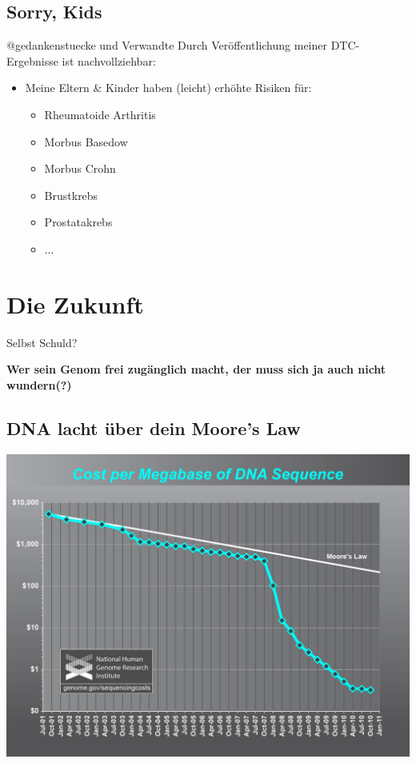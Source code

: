 \documentclass[12pt,a4paper]{beamer}
\begin{document}
\subsection{Sorry, Kids}
\begin{frame}{@gedankenstuecke und Verwandte}
	Durch Veröffentlichung meiner DTC-Ergebnisse ist nachvollziehbar: 
	\begin{itemize}
		\pause \item Meine Eltern \& Kinder haben (leicht) erhöhte Risiken für:
		\begin{itemize}
			\pause \item Rheumatoide Arthritis
			\pause \item Morbus Basedow
			\pause \item Morbus Crohn
			\pause \item Brustkrebs
			\pause \item Prostatakrebs
			\item ...
		\end{itemize} 
	\end{itemize}	
\end{frame}

\section{Die Zukunft}
\begin{frame}{Selbst Schuld?}
	\begin{center}
	\textbf{Wer sein Genom frei zugänglich macht, der muss sich ja auch nicht wundern(?)}
	\end{center}	
\end{frame}

\subsection{DNA lacht über dein Moore's Law}
\begin{frame}
	\begin{center}
		\includegraphics[scale=0.2]{moore.jpg}
	\end{center}
\end{frame}
\end{document}
